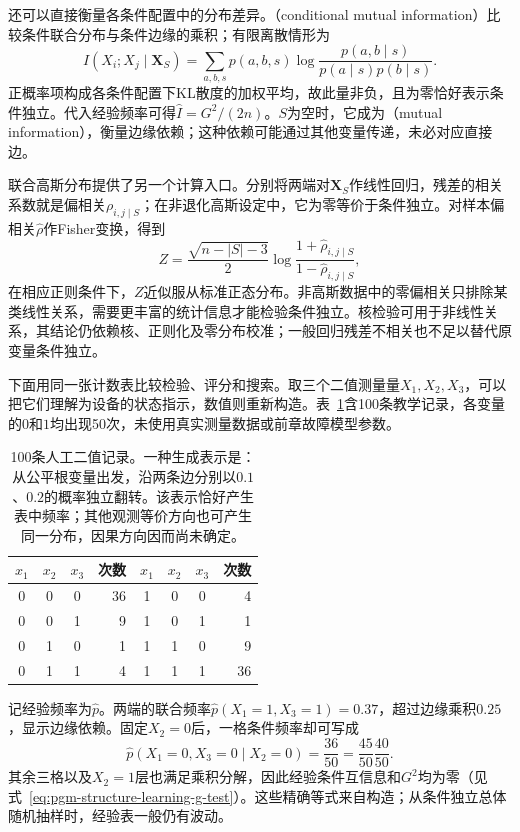 还可以直接衡量各条件配置中的分布差异。（conditional mutual information）比较条件联合分布与条件边缘的乘积；有限离散情形为
\[
  I(X_i;X_j\mid\bm{X}_S)
  =\sum_{a,b,s}p(a,b,s)
       \log\frac{p(a,b\mid s)}{p(a\mid s)p(b\mid s)}.
\]
正概率项构成各条件配置下KL散度的加权平均，故此量非负，且为零恰好表示条件独立。代入经验频率可得$\widehat I=G^2/(2n)$。$S$为空时，它成为（mutual information），衡量边缘依赖；这种依赖可能通过其他变量传递，未必对应直接边。

联合高斯分布提供了另一个计算入口。分别将两端对$\bm{X}_S$作线性回归，残差的相关系数就是偏相关$\rho_{i,j\mid S}$；在非退化高斯设定中，它为零等价于条件独立。对样本偏相关$\widehat\rho$作Fisher变换，得到
\[
  Z=\frac{\sqrt{n-|S|-3}}{2}
    \log\frac{1+\widehat\rho_{i,j\mid S}}
                  {1-\widehat\rho_{i,j\mid S}},
\]
在相应正则条件下，$Z$近似服从标准正态分布。非高斯数据中的零偏相关只排除某类线性关系，需要更丰富的统计信息才能检验条件独立。核检验可用于非线性关系，其结论仍依赖核、正则化及零分布校准；一般回归残差不相关也不足以替代原变量条件独立。

下面用同一张计数表比较检验、评分和搜索。取三个二值测量量$X_1,X_2,X_3$，可以把它们理解为设备的状态指示，数值则重新构造。表~\ref{tab:pgm-structure-learning-counts}含100条教学记录，各变量的$0$和$1$均出现50次，未使用真实测量数据或前章故障模型参数。

\begin{table}[htbp]
  \centering
  \begin{tabular}{ccc r@{\qquad}ccc r}
    \toprule
    $x_1$ & $x_2$ & $x_3$ & 次数 & $x_1$ & $x_2$ & $x_3$ & 次数 \\
    \midrule
    0 & 0 & 0 & 36 & 1 & 0 & 0 & 4 \\
    0 & 0 & 1 & 9  & 1 & 0 & 1 & 1 \\
    0 & 1 & 0 & 1  & 1 & 1 & 0 & 9 \\
    0 & 1 & 1 & 4  & 1 & 1 & 1 & 36 \\
    \bottomrule
  \end{tabular}
  \caption{100条人工二值记录。一种生成表示是：从公平根变量出发，沿两条边分别以$0.1$、$0.2$的概率独立翻转。该表示恰好产生表中频率；其他观测等价方向也可产生同一分布，因果方向因而尚未确定。}
  \label{tab:pgm-structure-learning-counts}
\end{table}

记经验频率为$\widehat p$。两端的联合频率$\widehat p(X_1=1,X_3=1)=0.37$，超过边缘乘积$0.25$，显示边缘依赖。固定$X_2=0$后，一格条件频率却可写成
\[
  \widehat p(X_1=0,X_3=0\mid X_2=0)
  =\frac{36}{50}=\frac{45}{50}\frac{40}{50}.
\]
其余三格以及$X_2=1$层也满足乘积分解，因此经验条件互信息和$G^2$均为零（见式~\eqref{eq:pgm-structure-learning-g-test}）。这些精确等式来自构造；从条件独立总体随机抽样时，经验表一般仍有波动。

